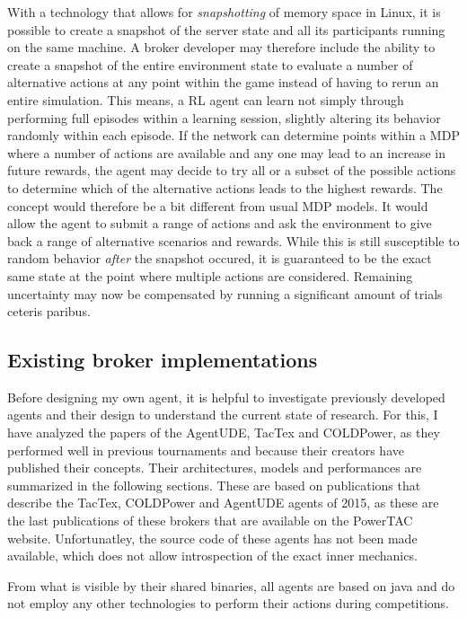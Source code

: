With a technology that allows for \emph{snapshotting} of memory space in Linux, it is possible to create a snapshot of
the server state and all its participants running on the same machine. A broker developer may therefore include the
ability to create a snapshot of the entire environment state to evaluate a number of alternative actions at any point
within the game instead of having to rerun an entire simulation. This means, a \ac{RL} agent can learn not simply
through performing full episodes within a learning session, slightly altering its behavior randomly within each episode.
If the network can determine points within a \ac{MDP} where a number of actions are available and any one may lead to an
increase in future rewards, the agent may decide to try all or a subset of the possible actions to determine which of
the alternative actions leads to the highest rewards. The concept would therefore be a bit different from usual \ac{MDP}
models. It would allow the agent to submit a range of actions and ask the environment to give back a range of
alternative scenarios and rewards. While this is still susceptible to random behavior \emph{after} the snapshot occured,
it is guaranteed to be the exact same state at the point where multiple actions are considered. Remaining uncertainty
may now be compensated by running a significant amount of trials ceteris paribus.




\subsection{Existing broker implementations}%
\label{sub:existing_broker_concepts}
Before designing my own agent, it is helpful to investigate previously developed agents and their design to understand
the current state of research. For this, I have analyzed the papers of the AgentUDE, TacTex and COLDPower, as they
performed well in previous tournaments and because their creators have published their concepts. Their architectures,
models and performances are summarized in the following sections. These are based on publications that describe the
TacTex, COLDPower and AgentUDE agents of 2015, as these are the last publications of these brokers that are available on
the \ac {PowerTAC} website. Unfortunatley, the source code of these agents has not been made available, which does not
allow introspection of the exact inner mechanics. 

From what is visible by their shared binaries, all agents are based on java and do not employ any other technologies to
perform their actions during competitions. 


